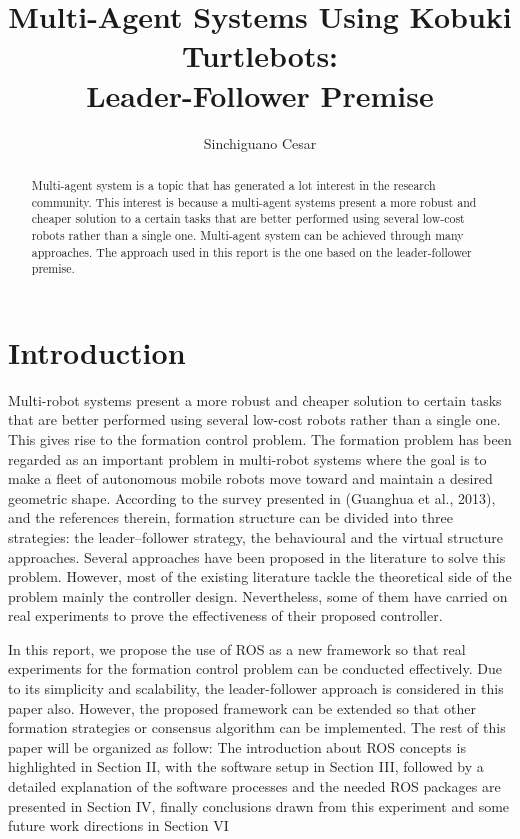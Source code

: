 \documentclass[journal]{IEEEtran}
\begin{document}
%
\title{Multi-Agent Systems Using Kobuki Turtlebots:\\Leader-Follower Premise}
\author{Sinchiguano Cesar}


\maketitle

\begin{abstract}

Multi-agent system is a topic that has generated a lot interest in the research community. This interest is because a multi-agent systems present a more robust and cheaper solution to a certain tasks that are better performed using several low-cost robots rather than a single one. Multi-agent system can be achieved through many approaches. The approach used in this report is the one based on the leader-follower premise.
\end{abstract}


\section{Introduction}


Multi-robot systems present a more robust and cheaper solution to certain tasks that are better performed using several low-cost robots rather than a single one. This gives rise to the formation control problem. The formation problem has been regarded as an important problem in multi-robot systems where the goal is to make a fleet of autonomous mobile robots move toward and maintain a desired geometric shape. According to the survey presented in (Guanghua et al., 2013), and the references therein, formation structure can be divided into three strategies: the leader–follower strategy, the behavioural and the virtual structure approaches. Several approaches have been proposed in the literature to solve this problem. However, most of the existing literature tackle the theoretical side of the problem mainly the controller design. Nevertheless, some of them have carried on real experiments to prove the effectiveness of their proposed controller. 

In this report, we propose the use of ROS as a new framework so that real experiments for the formation control problem can be conducted effectively. Due to its simplicity and scalability, the leader-follower approach is considered in this paper also. However, the proposed framework can be extended so that other formation strategies or consensus algorithm can be implemented. 
The rest of this paper will be organized as follow: The introduction about ROS concepts is highlighted in Section II, with the software setup in Section III, followed by a detailed explanation of the software processes and the needed ROS packages are presented  in Section IV, finally conclusions drawn from this experiment and some future work directions in Section VI
\end{document}
